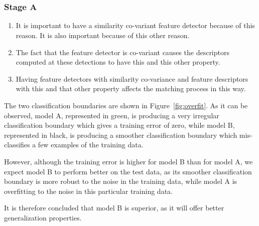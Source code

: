 \documentclass{article}
\begin{document}
\maketitle

\part{}

\section{Stage A}



\begin{enumerate}
	\item It is important to have a similarity co-variant feature detector because of this reason. It is also important because of this other reason.
	\item The fact that the feature detector is co-variant causes the descriptors computed at these detections to have this and this other property.
	\item Having feature detectors with similarity co-variance and feature descriptors with this and that other property affects the matching process in this way.
\end{enumerate}


The two classification boundaries are shown in Figure~\ref{fig:overfit}. As it can be observed, model A, represented in green, is producing a very irregular classification boundary which gives a training error of zero, while model B, represented in black, is producing a smoother classification boundary which mis-classifies a few examples of the training data.

However, although the training error is higher for model B than for model A, we expect model B to perform better on the test data, as its smoother classification boundary is more robust to the noise in the training data, while model A is overfitting to the noise in this particular training data.

It is therefore concluded that model B is superior, as it will offer better generalization properties.
\end{document}
